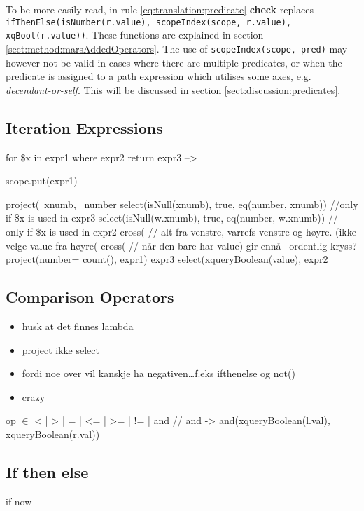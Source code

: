To be more easily read, in rule \ref{eq:translation:predicate} \textbf{check}
replaces \texttt{ifThenElse(isNumber(r.value), scopeIndex(scope, r.value),
xqBool(r.value))}. These functions are explained in section
\ref{sect:method:marsAddedOperators}. The use of \texttt{scopeIndex(scope,
pred)} may however not be valid in cases where there are multiple predicates,
or when the predicate is assigned to a path expression which utilises some
axes, e.g. \textit{decendant-or-self}. This will be discussed in section
\ref{sect:discussion:predicates}.


\subsection{Iteration Expressions}
\label{sect:translation:iteration}

for \$x in expr1 where expr2 return expr3  -->

scope.put(expr1)

project(~xnumb, ~number
    select(isNull(xnumb), true, eq(number, xnumb))             
    //only if \$x is  used in expr3 
    select(isNull(w.xnumb), true, eq(number, w.xnumb))         
    // only if \$x is used in expr2 
        cross(                     
    // alt fra venstre, varrefs venstre og høyre. (ikke velge value fra h\o yre(
            cross(                                             
          //  n\aa r den bare har value) gir enn\aa~ ordentlig kryss?
                project(number= count(), 
                    expr1)
                expr3
        select(xqueryBoolean(value),                                  
            expr2

\subsection{Comparison Operators}
\label{sect:translation:compOps}

\begin{itemize}
  \item husk at det finnes lambda
  \item project ikke select
  \item fordi noe over vil kanskje ha negativen\ldots f.eks ifthenelse og not()
  \item crazy
\end{itemize}
op $\in$ {< | > | = | <= | >= | != | and }        // and ->
and(xqueryBoolean(l.val), xqueryBoolean(r.val))

\subsection{If then else}
\label{sect:translation:ifThenElse}
if
now

